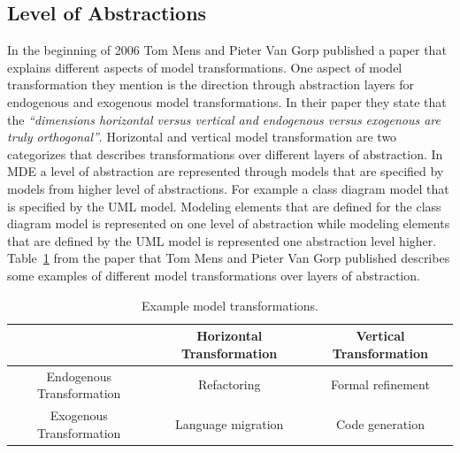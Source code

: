 \subsection{Level of Abstractions}

In the beginning of 2006 Tom Mens and Pieter Van Gorp published a paper that
explains different aspects of model transformations. One aspect of model
transformation they mention is the direction through abstraction layers for
endogenous and exogenous model transformations. In their paper they state that
the \textit{``dimensions horizontal versus vertical and endogenous versus
exogenous are truly orthogonal''}\cite{Mens2006}. Horizontal and vertical model
transformation are two categorizes that describes transformations over different
layers of abstraction. In MDE a level of abstraction are represented through
models that are specified by models from higher level of abstractions. For
example a class diagram model that is specified by the UML model. Modeling elements
that are defined for the class diagram model is represented on one level of
abstraction while modeling elements that are defined by the UML model is
represented one abstraction level higher. Table~\ref{tab:directions_mt} from
the paper that Tom Mens and Pieter Van Gorp published describes some examples of
different model transformations over layers of abstraction.

\begin{table}[ht]
\renewcommand*\arraystretch{1.2}
\centering
\begin{tabular}{| c | c | c |}
\hline

& Horizontal Transformation & Vertical Transformation \\ [0.5ex] 
\hline
Endogenous Transformation & Refactoring & Formal refinement \\ [0.5ex] 
Exogenous Transformation & Language migration & Code generation \\ [0.5ex]
 
\hline
\end{tabular}
\caption{Example model transformations.}
\label{tab:directions_mt}
\end{table} 

